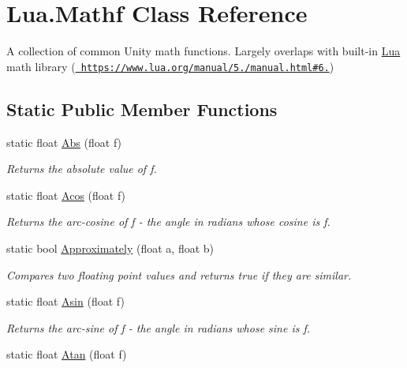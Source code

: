 \hypertarget{class_lua_1_1_mathf}{}\section{Lua.\+Mathf Class Reference}
\label{class_lua_1_1_mathf}


A collection of common Unity math functions. Largely overlaps with built-\/in \mbox{\hyperlink{namespace_lua}{Lua}} math library (\href{https://www.lua.org/manual/5.3/manual.html\#6.7}{\texttt{ https\+://www.\+lua.\+org/manual/5./manual.\+html\#6.}})  


\subsection*{Static Public Member Functions}
\begin{DoxyCompactItemize}
\item 
static float \mbox{\hyperlink{class_lua_1_1_mathf_a321380853cd01074ad91e673a7071c99}{Abs}} (float f)
\begin{DoxyCompactList}\small\item\em Returns the absolute value of f. \end{DoxyCompactList}\item 
static float \mbox{\hyperlink{class_lua_1_1_mathf_a33b558ad9dabaee4792399525a89e4ce}{Acos}} (float f)
\begin{DoxyCompactList}\small\item\em Returns the arc-\/cosine of f -\/ the angle in radians whose cosine is f. \end{DoxyCompactList}\item 
static bool \mbox{\hyperlink{class_lua_1_1_mathf_a2a53d9e05a8d05eaa05d1fced26906e6}{Approximately}} (float a, float b)
\begin{DoxyCompactList}\small\item\em Compares two floating point values and returns true if they are similar. \end{DoxyCompactList}\item 
static float \mbox{\hyperlink{class_lua_1_1_mathf_a85731b3f55f246a46df2a2f40bc87ae7}{Asin}} (float f)
\begin{DoxyCompactList}\small\item\em Returns the arc-\/sine of f -\/ the angle in radians whose sine is f. \end{DoxyCompactList}\item 
static float \mbox{\hyperlink{class_lua_1_1_mathf_a03740fc6f71760901fbe5f8a6295edeb}{Atan}} (float f)

\end{DoxyCompactItemize}
